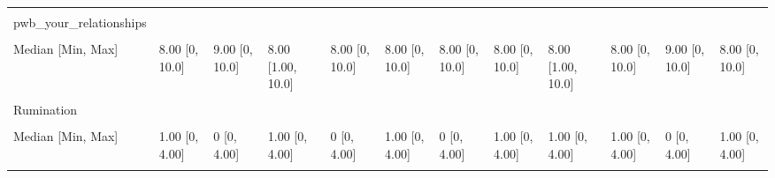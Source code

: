 \documentclass[
  single column]{article}
\begin{document}
\begin{landscape}
\begin{longtable}[t]{llllllllllll}
\cellcolor{gray!10}{Missing} & \cellcolor{gray!10}{168 (0.8\%)} & \cellcolor{gray!10}{13 (1.0\%)} & \cellcolor{gray!10}{3 (1.1\%)} & \cellcolor{gray!10}{23 (1.1\%)} & \cellcolor{gray!10}{30 (0.8\%)} & \cellcolor{gray!10}{8 (0.7\%)} & \cellcolor{gray!10}{3 (2.2\%)} & \cellcolor{gray!10}{2 (2.3\%)} & \cellcolor{gray!10}{6 (0.9\%)} & \cellcolor{gray!10}{6 (1.0\%)} & \cellcolor{gray!10}{10 (1.3\%)}\\
pwb\_your\_relationships &  &  &  &  &  &  &  &  &  &  & \\
\cellcolor{gray!10}{Mean (SD)} & \cellcolor{gray!10}{7.52 (2.27)} & \cellcolor{gray!10}{8.04 (2.12)} & \cellcolor{gray!10}{7.28 (2.35)} & \cellcolor{gray!10}{7.74 (2.25)} & \cellcolor{gray!10}{7.73 (2.14)} & \cellcolor{gray!10}{7.67 (2.27)} & \cellcolor{gray!10}{7.67 (2.25)} & \cellcolor{gray!10}{7.16 (2.25)} & \cellcolor{gray!10}{7.40 (2.42)} & \cellcolor{gray!10}{8.06 (2.00)} & \cellcolor{gray!10}{7.31 (2.49)}\\
\addlinespace
Median [Min, Max] & 8.00 [0, 10.0] & 9.00 [0, 10.0] & 8.00 [1.00, 10.0] & 8.00 [0, 10.0] & 8.00 [0, 10.0] & 8.00 [0, 10.0] & 8.00 [0, 10.0] & 8.00 [1.00, 10.0] & 8.00 [0, 10.0] & 9.00 [0, 10.0] & 8.00 [0, 10.0]\\
\cellcolor{gray!10}{Missing} & \cellcolor{gray!10}{113 (0.5\%)} & \cellcolor{gray!10}{10 (0.7\%)} & \cellcolor{gray!10}{0 (0\%)} & \cellcolor{gray!10}{17 (0.8\%)} & \cellcolor{gray!10}{26 (0.7\%)} & \cellcolor{gray!10}{8 (0.7\%)} & \cellcolor{gray!10}{2 (1.5\%)} & \cellcolor{gray!10}{0 (0\%)} & \cellcolor{gray!10}{11 (1.7\%)} & \cellcolor{gray!10}{7 (1.2\%)} & \cellcolor{gray!10}{7 (0.9\%)}\\
Rumination &  &  &  &  &  &  &  &  &  &  & \\
\cellcolor{gray!10}{Mean (SD)} & \cellcolor{gray!10}{0.904 (1.05)} & \cellcolor{gray!10}{0.610 (0.882)} & \cellcolor{gray!10}{0.974 (1.07)} & \cellcolor{gray!10}{0.794 (0.994)} & \cellcolor{gray!10}{0.838 (0.998)} & \cellcolor{gray!10}{0.784 (0.991)} & \cellcolor{gray!10}{0.985 (1.13)} & \cellcolor{gray!10}{1.00 (1.11)} & \cellcolor{gray!10}{1.23 (1.16)} & \cellcolor{gray!10}{0.641 (0.902)} & \cellcolor{gray!10}{1.11 (1.19)}\\
Median [Min, Max] & 1.00 [0, 4.00] & 0 [0, 4.00] & 1.00 [0, 4.00] & 0 [0, 4.00] & 1.00 [0, 4.00] & 0 [0, 4.00] & 1.00 [0, 4.00] & 1.00 [0, 4.00] & 1.00 [0, 4.00] & 0 [0, 4.00] & 1.00 [0, 4.00]\\
\addlinespace
\cellcolor{gray!10}{Missing} & \cellcolor{gray!10}{90 (0.4\%)} & \cellcolor{gray!10}{9 (0.7\%)} & \cellcolor{gray!10}{0 (0\%)} & \cellcolor{gray!10}{8 (0.4\%)} & \cellcolor{gray!10}{21 (0.6\%)} & \cellcolor{gray!10}{5 (0.5\%)} & \cellcolor{gray!10}{0 (0\%)} & \cellcolor{gray!10}{0 (0\%)} & \cellcolor{gray!10}{5 (0.8\%)} & \cellcolor{gray!10}{5 (0.9\%)} & \cellcolor{gray!10}{9 (1.2\%)}\\

\end{longtable}
\end{landscape}
\end{document}
